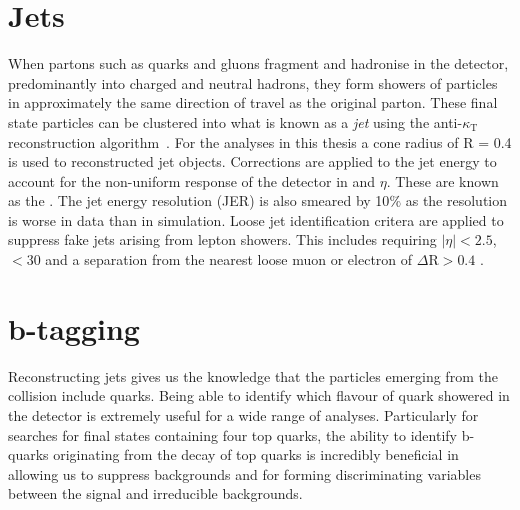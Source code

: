 \section{Jets \label{sec:jetreco}}
When partons such as quarks and gluons fragment and hadronise in the detector, predominantly into charged and neutral hadrons, they form showers of particles in approximately the same direction of travel as the original parton. These final state particles can be clustered into what is known as a \emph{jet} using the anti-$\kappa_{\textrm{T}}$ reconstruction algorithm~\cite{Cacciari:2008gp}. For the analyses in this thesis a cone radius of R = 0.4 is used to reconstructed jet objects. Corrections are applied to the jet energy to account for the non-uniform response of the detector in \pt and $\eta$. These are known as the . The jet energy resolution (JER) is also smeared by 10$\%$ as the resolution is worse in data than in simulation. Loose jet identification critera are applied to suppress fake jets arising from lepton showers. This includes requiring $|\eta|<2.5$, \pt$<30$ and a separation from the nearest loose muon or electron of $\Delta\textrm{R}>0.4$ .

\section{b-tagging ~\label{sec:btagreco}}
Reconstructing jets gives us the knowledge that the particles emerging from the collision include quarks. Being able to identify which flavour of quark showered in the detector is extremely useful for a wide range of analyses. Particularly for searches for final states containing four top quarks, the ability to identify b-quarks originating from the decay of top quarks is incredibly beneficial in allowing us to suppress backgrounds and for forming discriminating variables between the signal and irreducible backgrounds. 

